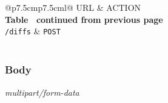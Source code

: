 \begin{longtable}[c]{@{}p{7.5cm}p{7.5cm}l@{}}
  \toprule
  URL             & ACTION                                    \\* \midrule
  \endfirsthead
  \multicolumn{3}{c}%
  {{\bfseries Table \thetable\ continued from previous page}} \\
  \endhead
  \bottomrule
  \endfoot
  \endlastfoot
  \texttt{/diffs} & \texttt{POST}                             \\* \bottomrule
  \label{tab:rdf-differ-create-diffs}                         \\
\end{longtable}

\subsubsection{Body}
\textit{multipart/form-data}

